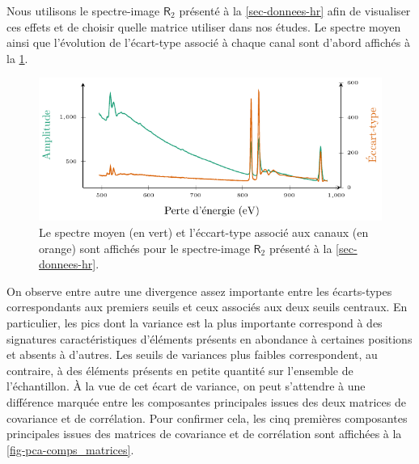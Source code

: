         Nous utilisons le spectre-image $\mathsf{R}_2$ présenté à la \cref{sec-donnees-hr} afin de visualiser ces effets et de choisir quelle matrice utiliser dans nos études.
        Le spectre moyen ainsi que l'évolution de l'écart-type associé à chaque canal sont d'abord affichés à la \cref{fig-pca-variance-data}.
        \begin{figure}
            \centering
            \includegraphics{img/chapitre1/figure16/data_variance.pdf}
            \caption{Le spectre moyen (en vert) et l'éccart-type associé aux canaux (en orange) sont affichés pour le spectre-image $\mathsf{R}_2$ présenté à la \cref{sec-donnees-hr}.
                \protect\label{fig-pca-variance-data}}
        \end{figure}
        On observe entre autre une divergence assez importante entre les écarts-types correspondants aux premiers seuils et ceux associés aux deux seuils centraux. En particulier, les pics dont la variance est la plus importante correspond à des signatures caractéristiques d'éléments présents en abondance à certaines positions et absents à d'autres. Les seuils de variances plus faibles correspondent, au contraire, à des éléments présents en petite quantité sur l'ensemble de l'échantillon. \`A la vue de cet écart de variance, on peut s'attendre à une différence marquée entre les composantes principales issues des deux matrices de covariance et de corrélation. Pour confirmer cela, les cinq premières composantes principales issues des matrices de covariance et de corrélation sont affichées à la \cref{fig-pca-comps_matrices}.
